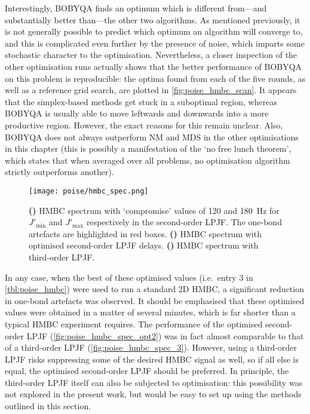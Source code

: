 Interestingly, BOBYQA finds an optimum which is different from---and substantially better than---the other two algorithms.
As mentioned previously, it is not generally possible to predict which optimum an algorithm will converge to, and this is complicated even further by the presence of noise, which imparts some stochastic character to the optimisation.
Nevertheless, a closer inspection of the other optimisation runs actually shows that the better performance of BOBYQA on this problem is reproducible: the optima found from each of the five rounds, as well as a reference grid search, are plotted in \cref{fig:poise_hmbc_scan}.
It appears that the simplex-based methods get stuck in a suboptimal region, whereas BOBYQA is usually able to move leftwards and downwards into a more productive region.
However, the exact reasons for this remain unclear.
Also, BOBYQA does not always outperform NM and MDS in the other optimisations in this chapter (this is possibly a manifestation of the `no free lunch theorem'\autocite{Wolpert1997IEEETEC}, which states that when averaged over all problems, no optimisation algorithm strictly outperforms another).

\begin{figure}[htb]
    \centering
    \texttt{[image: poise/hmbc\_spec.png]}%
    {\label{fig:poise_hmbc_spec_unopt2}}%
    {\label{fig:poise_hmbc_spec_opt2}}%
    {\label{fig:poise_hmbc_spec_3}}%
    \caption[HMBC spectra before and after optimisation]{
        \textbf{()} HMBC spectrum with `compromise' values of 120 and \qty{180}{\Hz} for $J'_\text{min}$ and $J'_\text{max}$ respectively in the second-order LPJF.
        The one-bond artefacts are highlighted in red boxes.
        \textbf{()} HMBC spectrum with optimised second-order LPJF delays.
        \textbf{()} HMBC spectrum with third-order LPJF.
    }
    \label{fig:poise_hmbc_spec}
\end{figure}

In any case, when the best of these optimised values (i.e.\ entry 3 in \cref{tbl:poise_hmbc}) were used to run a standard 2D HMBC, a significant reduction in one-bond artefacts was observed.
It should be emphasised that these optimised values were obtained in a matter of several minutes, which is far shorter than a typical HMBC experiment requires.
The performance of the optimised second-order LPJF (\cref{fig:poise_hmbc_spec_opt2}) was in fact almost comparable to that of a third-order LPJF (\cref{fig:poise_hmbc_spec_3}).
However, using a third-order LPJF risks suppressing some of the desired HMBC signal as well, so if all else is equal, the optimised second-order LPJF should be preferred.
In principle, the third-order LPJF itself can also be subjected to optimisation: this possibility was not explored in the present work, but would be easy to set up using the methods outlined in this section.


